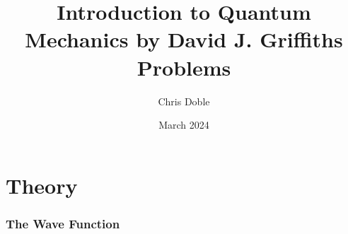 \documentclass{article}
\title{Introduction to Quantum Mechanics by David J. Griffiths Problems}
\author{Chris Doble}
\date{March 2024}
\begin{document}
\maketitle

\tableofcontents

\part{Theory}

\section{The Wave Function}

\subsection{}
\end{document}
